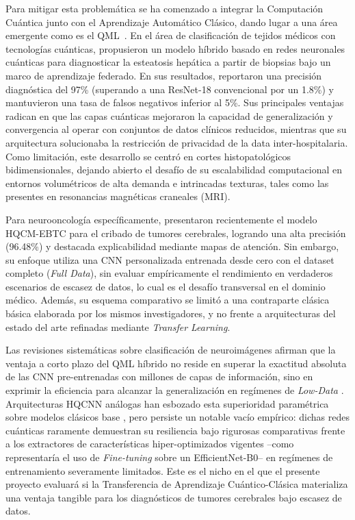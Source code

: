 \documentclass[12pt,letterpaper]{article}
\begin{document}
    Para mitigar esta problemática se ha comenzado a integrar la Computación Cuántica junto con el Aprendizaje Automático Clásico, dando lugar a una área emergente como es el QML~\citep{Lloyd2013}. En el área de clasificación de tejidos médicos con tecnologías cuánticas, \citet{lusnig2024leveraging} propusieron un modelo híbrido basado en redes neuronales cuánticas para diagnosticar la esteatosis hepática a partir de biopsias bajo un marco de aprendizaje federado. En sus resultados, reportaron una precisión diagnóstica del 97\% (superando a una ResNet-18 convencional por un 1.8\%) y mantuvieron una tasa de falsos negativos inferior al 5\%. Sus principales ventajas radican en que las capas cuánticas mejoraron la capacidad de generalización y convergencia al operar con conjuntos de datos clínicos reducidos, mientras que su arquitectura solucionaba la restricción de privacidad de la data inter-hospitalaria. Como limitación, este desarrollo se centró en cortes histopatológicos bidimensionales, dejando abierto el desafío de su escalabilidad computacional en entornos volumétricos de alta demanda e intrincadas texturas, tales como las presentes en resonancias magnéticas craneales (MRI).

    Para neurooncología específicamente, \citet{haddou2025hqcm} presentaron recientemente el modelo HQCM-EBTC para el cribado de tumores cerebrales, logrando una alta precisión (96.48\%) y destacada explicabilidad mediante mapas de atención. Sin embargo, su enfoque utiliza una CNN personalizada entrenada desde cero con el dataset completo (\textit{Full Data}), sin evaluar empíricamente el rendimiento en verdaderos escenarios de escasez de datos, lo cual es el desafío transversal en el dominio médico. Además, su esquema comparativo se limitó a una contraparte clásica básica elaborada por los mismos investigadores, y no frente a arquitecturas del estado del arte refinadas mediante \textit{Transfer Learning}.

    Las revisiones sistemáticas sobre clasificación de neuroimágenes afirman que la ventaja a corto plazo del QML híbrido no reside en superar la exactitud absoluta de las CNN pre-entrenadas con millones de capas de información, sino en exprimir la eficiencia para alcanzar la generalización en regímenes de \textit{Low-Data} \citep{khan2024brain, shahriyar2025advancements}. Arquitecturas HQCNN análogas han esbozado esta superioridad paramétrica sobre modelos clásicos base \citep{haddou2025hqcm}, pero persiste un notable vacío empírico: dichas redes cuánticas raramente demuestran su resiliencia bajo rigurosas comparativas frente a los extractores de características hiper-optimizados vigentes --como representaría el uso de \textit{Fine-tuning} sobre un EfficientNet-B0-- en regímenes de entrenamiento severamente limitados. Este es el nicho en el que el presente proyecto evaluará si la Transferencia de Aprendizaje Cuántico-Clásica materializa una ventaja tangible para los diagnósticos de tumores cerebrales bajo escasez de datos.
\end{document}
